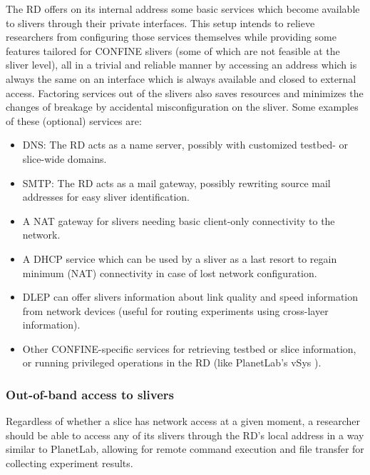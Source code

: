 \documentclass[conference]{IEEEtran}
\begin{document}
The RD offers on its internal address some basic services which become
available to slivers through their private interfaces.  This setup intends to
relieve researchers from configuring those services themselves while providing
some features tailored for CONFINE slivers (some of which are not feasible at
the sliver level), all in a trivial and reliable manner by accessing an
address which is always the same on an interface which is always available and
closed to external access.  Factoring services out of the slivers also saves
resources and minimizes the changes of breakage by accidental misconfiguration
on the sliver.  Some examples of these (optional) services are:

\begin{itemize}
\item DNS: The RD acts as a name server, possibly with customized testbed- or
  slice-wide domains.
\item SMTP: The RD acts as a mail gateway, possibly rewriting source mail
  addresses for easy sliver identification.
\item A NAT gateway for slivers needing basic client-only connectivity to the
  network.
\item A DHCP service which can be used by a sliver as a last resort to regain
  minimum (NAT) connectivity in case of lost network configuration.
\item DLEP \cite{dlep} can offer slivers information about link quality and
  speed information from network devices (useful for routing experiments using
  cross-layer information).
\item Other CONFINE-specific services for retrieving testbed or slice
  information, or running privileged operations in the RD (like PlanetLab's
  vSys \cite{vsys}).
\end{itemize}


\subsubsection{Out-of-band access to slivers}

Regardless of whether a slice has network access at a given moment, a
researcher should be able to access any of its slivers through the RD's local address in a
way similar to PlanetLab, allowing for remote
command execution and file transfer for collecting experiment results.
\end{document}
